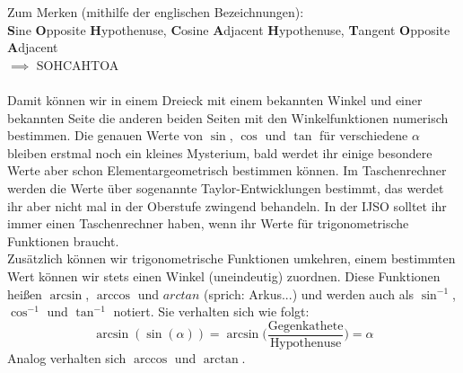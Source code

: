 \documentclass[11pt]{article}
\begin{document}
Zum Merken (mithilfe der englischen Bezeichnungen): \\
\textbf{S}ine \textbf{O}pposite \textbf{H}ypothenuse, \textbf{C}osine \textbf{A}djacent \textbf{H}ypothenuse, \textbf{T}angent \textbf{O}pposite \textbf{A}djacent \\
$\implies$ SOHCAHTOA \\\\
Damit können wir in einem Dreieck mit einem bekannten Winkel und einer bekannten Seite die anderen beiden Seiten mit den Winkelfunktionen numerisch bestimmen. Die genauen Werte von $\sin$, $\cos$ und $\tan$ für verschiedene $\alpha$ bleiben erstmal noch ein kleines Mysterium, bald werdet ihr einige besondere Werte aber schon Elementargeometrisch bestimmen können. Im Taschenrechner werden die Werte über sogenannte Taylor-Entwicklungen bestimmt, das werdet ihr aber nicht mal in der Oberstufe zwingend behandeln. In der IJSO solltet ihr immer einen Taschenrechner haben, wenn ihr Werte für trigonometrische Funktionen braucht. \\

Zusätzlich können wir trigonometrische Funktionen umkehren, einem bestimmten Wert können wir stets einen Winkel (uneindeutig) zuordnen. Diese Funktionen heißen $\arcsin$, $\arccos$ und $arctan$ (sprich: Arkus...) und werden auch als $\sin^{-1}$, $\cos^{-1}$ und $\tan^{-1}$ notiert. Sie verhalten sich wie folgt: 
$$\arcsin(\sin(\alpha)) = \arcsin\bigg(\frac{\text{Gegenkathete}}{\text{Hypothenuse}}\bigg) = \alpha$$
Analog verhalten sich $\arccos$ und $\arctan$.
\end{document}
